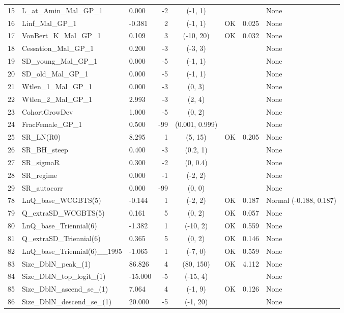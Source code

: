 \documentclass[12pt,]{article}
\begin{document}
\begin{landscape}
\begin{longtable}{lp{2.5in}lrcccl}
  15 & L\_at\_Amin\_Mal\_GP\_1 & 0.000 & -2 & (-1, 1) &  &  & None \\ 
  16 & Linf\_Mal\_GP\_1 & -0.381 & 2 & (-1, 1) & OK & 0.025 & None \\ 
  17 & VonBert\_K\_Mal\_GP\_1 & 0.109 & 3 & (-10, 20) & OK & 0.032 & None \\ 
  18 & Cessation\_Mal\_GP\_1 & 0.200 & -3 & (-3, 3) &  &  & None \\ 
  19 & SD\_young\_Mal\_GP\_1 & 0.000 & -5 & (-1, 1) &  &  & None \\ 
  20 & SD\_old\_Mal\_GP\_1 & 0.000 & -5 & (-1, 1) &  &  & None \\ 
  21 & Wtlen\_1\_Mal\_GP\_1 & 0.000 & -3 & (0, 3) &  &  & None \\ 
  22 & Wtlen\_2\_Mal\_GP\_1 & 2.993 & -3 & (2, 4) &  &  & None \\ 
  23 & CohortGrowDev & 1.000 & -5 & (0, 2) &  &  & None \\ 
  24 & FracFemale\_GP\_1 & 0.500 & -99 & (0.001, 0.999) &  &  & None \\ 
  25 & SR\_LN(R0) & 8.295 & 1 & (5, 15) & OK & 0.205 & None \\ 
  26 & SR\_BH\_steep & 0.400 & -3 & (0.2, 1) &  &  & None \\ 
  27 & SR\_sigmaR & 0.300 & -2 & (0, 0.4) &  &  & None \\ 
  28 & SR\_regime & 0.000 & -1 & (-2, 2) &  &  & None \\ 
  29 & SR\_autocorr & 0.000 & -99 & (0, 0) &  &  & None \\ 
  78 & LnQ\_base\_WCGBTS(5) & -0.144 & 1 & (-2, 2) & OK & 0.187 & Normal (-0.188, 0.187) \\ 
  79 & Q\_extraSD\_WCGBTS(5) & 0.161 & 5 & (0, 2) & OK & 0.057 & None \\ 
  80 & LnQ\_base\_Triennial(6) & -1.382 & 1 & (-10, 2) & OK & 0.559 & None \\ 
  81 & Q\_extraSD\_Triennial(6) & 0.365 & 5 & (0, 2) & OK & 0.146 & None \\ 
  82 & LnQ\_base\_Triennial(6)\_\_1995 & -1.065 & 1 & (-7, 0) & OK & 0.559 & None \\ 
  83 & Size\_DblN\_peak\_(1) & 86.826 & 4 & (80, 150) & OK & 4.112 & None \\ 
  84 & Size\_DblN\_top\_logit\_(1) & -15.000 & -5 & (-15, 4) &  &  & None \\ 
  85 & Size\_DblN\_ascend\_se\_(1) & 7.064 & 4 & (-1, 9) & OK & 0.126 & None \\ 
  86 & Size\_DblN\_descend\_se\_(1) & 20.000 & -5 & (-1, 20) &  &  & None \\ 

\end{longtable}
\end{landscape}
\end{document}
